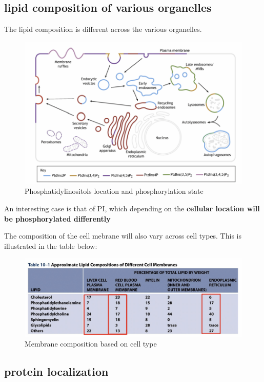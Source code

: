 \documentclass[../main.tex]{subfiles}
\begin{document}
\subsection{lipid composition of various organelles}
The lipid composition is different across the various organelles. 
\begin{figure}[H]
    \centering
    \includegraphics[width=\linewidth]{PI_overview.png}
    \caption{Phosphatidylinositols location and phosphorylation state}
    \label{fig:enter-label}
\end{figure}
An interesting case is that of PI, which depending on the\textbf{ cellular location will be phosphorylated differently}

The composition of the cell mebrane will also vary across cell types. This is illustrated in the table below:
\begin{figure}[H]
    \centering
    \includegraphics[width=\linewidth]{Mebranecomposition.png}
    \caption{Membrane composition based on cell type}
    \label{fig:enter-label}
\end{figure}


\subsection{protein localization}
\end{document}
